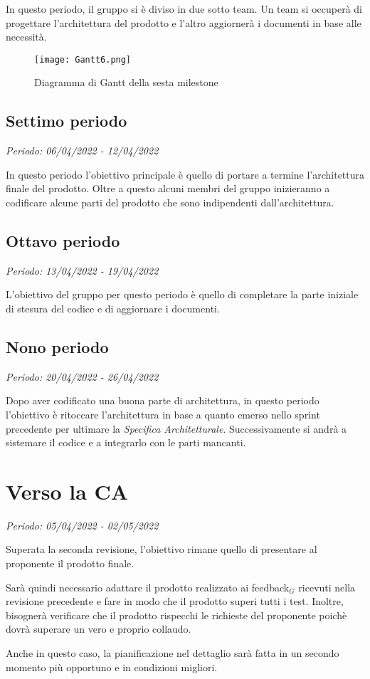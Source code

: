In questo periodo, il gruppo si è diviso in due sotto team. Un team si occuperà di progettare l'architettura del prodotto e l'altro aggiornerà i documenti in base alle necessità.

\begin{figure}[H]
    \texttt{[image: Gantt6.png]}
    \caption{Diagramma di Gantt della sesta milestone}
\end{figure}

\subsection{Settimo periodo}
\textit{Periodo: 06/04/2022 - 12/04/2022}

In questo periodo l'obiettivo principale è quello di portare a termine l'architettura finale del prodotto. Oltre a questo alcuni membri del gruppo inizieranno a codificare alcune parti del prodotto che sono indipendenti dall'architettura.

\subsection{Ottavo periodo}
\textit{Periodo: 13/04/2022 - 19/04/2022}

L'obiettivo del gruppo per questo periodo è quello di completare la parte iniziale di stesura del codice e di aggiornare i documenti.

\subsection{Nono periodo}
\textit{Periodo: 20/04/2022 - 26/04/2022}

Dopo aver codificato una buona parte di architettura, in questo periodo l'obiettivo è ritoccare l'architettura in base a quanto emerso nello sprint precedente per ultimare la \textit{Specifica Architetturale}. Successivamente si andrà a sistemare il codice e a integrarlo con le parti mancanti.

\section{Verso la CA}

\textit{Periodo: 05/04/2022 - 02/05/2022}

Superata la seconda revisione, l'obiettivo rimane quello di presentare al proponente il prodotto finale.

Sarà quindi necessario adattare il prodotto realizzato ai feedback$_G$ ricevuti nella revisione precedente e fare in modo che il prodotto superi tutti i test. Inoltre, bisognerà
verificare che il prodotto rispecchi le richieste del proponente poichè dovrà superare un vero e proprio collaudo.

Anche in questo caso, la pianificazione nel dettaglio sarà fatta in un secondo momento più opportuno e in condizioni migliori.

